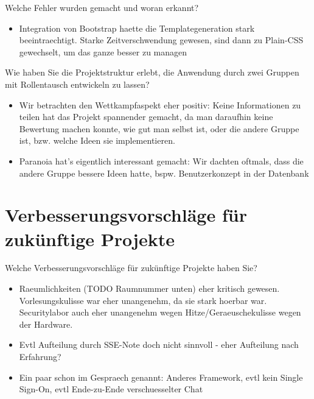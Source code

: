 \documentclass[12pt,DIV14,BCOR10mm,a4paper,parskip=half-,headsepline,headinclude,english,ngerman,bibliography=totocnumbered]{scrreprt}
\begin{document}
Welche Fehler wurden gemacht und woran erkannt?

\begin{itemize}
  \item Integration von Bootstrap haette die Templategeneration stark beeintraechtigt. Starke Zeitverschwendung gewesen, sind dann zu Plain-CSS gewechselt, um das ganze besser zu managen
\end{itemize}

Wie haben Sie die Projektstruktur erlebt, die Anwendung durch zwei Gruppen mit Rollentausch entwickeln zu lassen?

\begin{itemize}
  \item Wir betrachten den Wettkampfaspekt eher positiv: Keine Informationen zu teilen hat das Projekt spannender gemacht, da man daraufhin keine Bewertung machen konnte, wie gut man selbst ist, oder die andere Gruppe ist, bzw. welche Ideen sie implementieren.
  \item Paranoia hat's eigentlich interessant gemacht: Wir dachten oftmals, dass die andere Gruppe bessere Ideen hatte, bspw. Benutzerkonzept in der Datenbank
\end{itemize}

\chapter{Verbesserungsvorschläge für zukünftige Projekte}

Welche Verbesserungsvorschläge für zukünftige Projekte haben Sie?

\begin{itemize}
  \item Raeumlichkeiten (TODO Raumnummer unten) eher kritisch gewesen. Vorlesungskulisse war eher unangenehm, da sie stark hoerbar war. Securitylabor auch eher unangenehm wegen Hitze/Geraeuschekulisse wegen der Hardware.
  \item Evtl Aufteilung durch SSE-Note doch nicht sinnvoll - eher Aufteilung nach Erfahrung?
  \item Ein paar schon im Gespraech genannt: Anderes Framework, evtl kein Single Sign-On, evtl Ende-zu-Ende verschuesselter Chat
\end{itemize}

\printbibliography

\printacronyms[title=Abkürzungsverzeichnis,toctitle=Abkürzungsverzeichnis]
\printglossary[title=Glossar,toctitle=Glossar,type=main]

\iftotalfigures
  \listoffigures
\fi


\begin{appendices}

\end{appendices}
\end{document}
